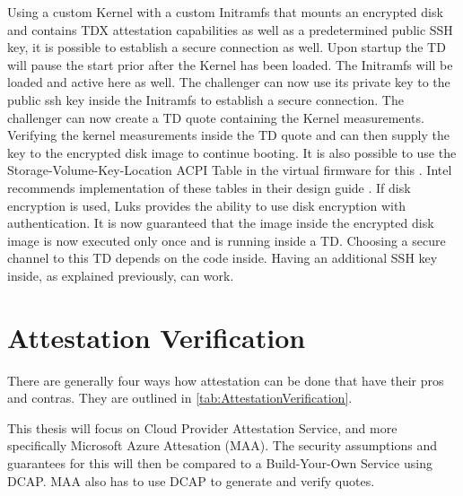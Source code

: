 Using a custom Kernel with a custom Initramfs that mounts an encrypted disk and contains TDX attestation capabilities as well as a predetermined public SSH key, it is possible to establish a secure connection as well. Upon startup the TD will pause the start prior after the Kernel has been loaded. The Initramfs will be loaded and active here as well. The challenger can now use its private key to the public ssh key inside the Initramfs to establish a secure connection. The challenger can now create a TD quote containing the Kernel measurements. Verifying the kernel measurements inside the TD quote and can then supply the key to the encrypted disk image to continue booting. It is also possible to use the Storage-Volume-Key-Location ACPI Table in the virtual firmware for this \cite{uefi_forum_inc_acpi_docu_2022}. Intel recommends implementation of these tables in their design guide \cite{intel_corporation_tdx-virtual-firmware-design-guide-rev-004-20231206pdf_2023}. If disk encryption is used, Luks provides the ability to use disk encryption with authentication. It is now guaranteed that the image inside the encrypted disk image is now executed only once and is running inside a TD. Choosing a secure channel to this TD depends on the code inside. Having an additional SSH key inside, as explained previously, can work.

\section{Attestation Verification}

There are generally four ways how attestation can be done that have their pros and contras. They are outlined in \cref{tab:AttestationVerification}. 
\begin{table}
\centering
{}
\caption{Overview of 4 different Attestation Verification methods}
\label{tab:AttestationVerification}
\end{table}
This thesis will focus on Cloud Provider Attestation Service, and more specifically Microsoft Azure Attesation (MAA). The security assumptions and guarantees for this will then be compared to a Build-Your-Own Service using DCAP. MAA also has to use DCAP to generate and verify quotes.

